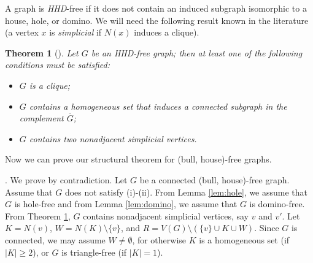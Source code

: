 \documentclass[a4paper,11pt]{article}
\newtheorem{theorem}{Theorem}[section]
\theoremstyle{case}
\begin{document}
A graph is {\it HHD}-free if it does not contain an induced subgraph isomorphic to a house, hole, or domino. We will need the following result known in the literature (a vertex $x$ is {\it simplicial} if $N(x)$ induces a clique). 
\begin{theorem}[\cite{HoaKho1988}]\label{thm:HHD-free}
    Let $G$ be an HHD-free graph; then at least one of the following conditions must be satisfied:
    \begin{itemize}[noitemsep, topsep=0pt]
        \item[(i)] $G$ is a clique;
        \item[(ii)] $G$ contains a homogeneous set that induces a connected subgraph in the complement $\overline{G}$;
        \item[(iii)] $G$ contains two nonadjacent simplicial vertices.
    \end{itemize}
\end{theorem}

Now we can prove our structural theorem for (bull, house)-free graphs. 

. We prove by contradiction. Let $G$ be a connected (bull, house)-free graph. Assume that $G$ does not satisfy (i)-(ii). From Lemma \ref{lem:hole}, we assume that $G$ is hole-free and from Lemma \ref{lem:domino}, we assume that $G$ is domino-free. From Theorem \ref{thm:HHD-free}, $G$ contains nonadjacent simplicial vertices, say $v$ and $v'$. Let $K = N(v)$, $W = N(K) \setminus \{v\}$, and  $R = V(G) \setminus (\{v\}\cup K\cup W)$. Since $G$ is connected,  we may assume $W \not = \emptyset$, for otherwise $K$ is a homogeneous set (if $|K| \geq 2$), or $G$ is triangle-free (if $|K| = 1$). 
\end{document}
